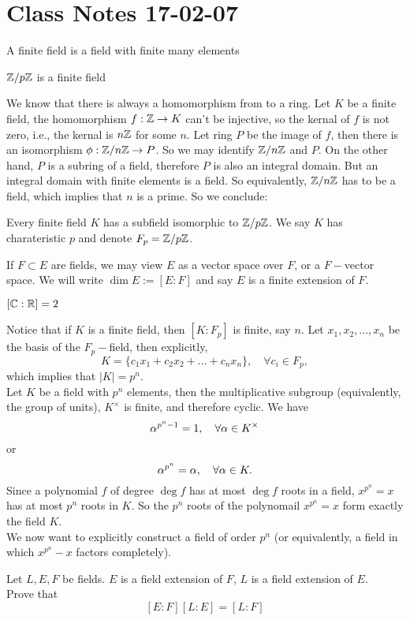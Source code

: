 \documentclass{mynotes}
\begin{document}
\section{Class Notes 17-02-07}
\begin{definition}
	A finite field is a field with finite many elements
\end{definition}
\begin{example}
	$\mathbb{Z}/p\mathbb{Z}$ is a finite field
\end{example}
We know that there is always a homomorphism from \Z to a ring. Let $K$ be a finite field, the homomorphism $f: \mathbb{Z}\rightarrow K$ can't be injective, so the kernal of $f$ is not zero, i.e., the kernal is $n\mathbb{Z}$ for some $n$. Let ring $P$ be the image of $f$, then there is an isomorphism $\phi: \mathbb{Z}/n\mathbb{Z}\rightarrow P$. So we may identify $\mathbb{Z}/n\mathbb{Z}$ and $P$. On the other hand, $P$ is a subring of a field, therefore $P$ is also an integral domain. But an integral domain with finite elements is a field. So equivalently, $\mathbb{Z}/n\mathbb{Z}$ has to be a field, which implies that $n$ is a prime. So we conclude: 
\begin{theorem}
Every finite field $K$ has a subfield isomorphic to $\mathbb{Z}/p\mathbb{Z}$. We say $K$ has charateristic $p$ and denote $F_p=\mathbb{Z}/p\mathbb{Z}$.
\end{theorem}
If $F\subset E$ are fields, we may view $E$ as a vector space over $F$, or a $F-$vector space. We will write $\dim{E}:=[E:F]$ and say $E$ is a finite extension of $F$.
\begin{example}
	$[\mathbb{C}:\mathbb{R}]=2$
\end{example}
Notice that if $K$ is a finite field, then $[K:F_p]$ is finite, say $n$. Let $x_1,x_2,\ldots, x_n$ be the basis of the $F_p-$field, then explicitly, $$K=\{c_1x_1+c_2x_2+\ldots + c_nx_n\},\quad\forall c_i\in F_p,$$which implies that $|K| = p^n$.\\
Let $K$ be a field with $p^n$ elements, then the multiplicative subgroup (equivalently, the group of units), $K^{\times}$ is finite, and therefore cyclic. We have $$\alpha^{p^n-1}=1,\quad\forall \alpha\in K^{\times}$$or $$\alpha^{p^n}=\alpha,\quad\forall \alpha\in K.$$Since a polynomial $f$ of degree $\deg f$ has at most $\deg f$ roots in a field, $x^{p^n}=x$ has at most $p^n$ roots in $K$. So the $p^n$ roots of the polynomail $x^{p^n}=x$ form exactly the field $K$.\\
We now want to explicitly construct a field of order $p^n$ (or equivalently, a field in which $x^{p^n}-x$ factors completely). 
\begin{exercise}
	Let $L,E,F$ be fields. $E$ is a field extension of $F$, $L$ is a field extension of $E$.\\ Prove that 
	$$[E:F][L:E]=[L:F]
	$$ 
\end{exercise}
\end{document}

